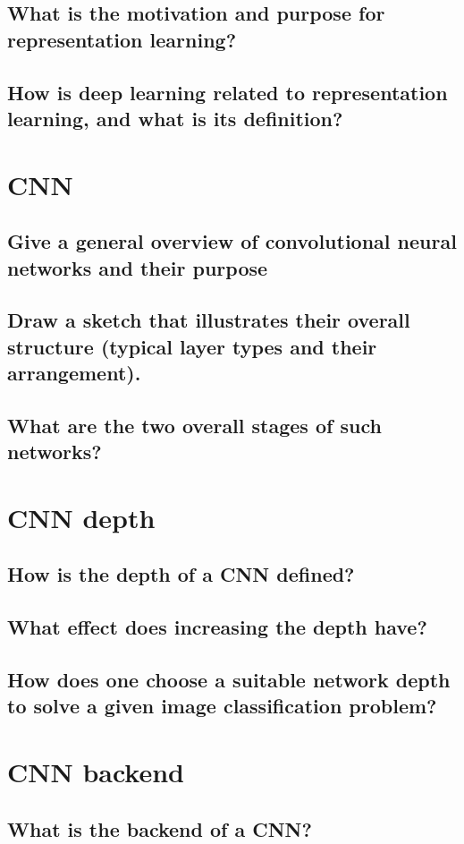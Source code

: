 \subsection{What is the motivation and purpose for representation learning?}
\subsection{How is deep learning related to representation learning, and what is its definition?}

\section{CNN}
\subsection{Give a general overview of convolutional neural networks and their purpose}
\subsection{Draw a sketch that illustrates their overall structure (typical layer types and their arrangement).}
\subsection{What are the two overall stages of such networks?}

\section{CNN depth}
\subsection{How is the depth of a CNN defined?}
\subsection{What effect does increasing the depth have?}
\subsection{How does one choose a suitable network depth to solve a given image classification problem?}

\section{CNN backend}
\subsection{What is the backend of a CNN?}
